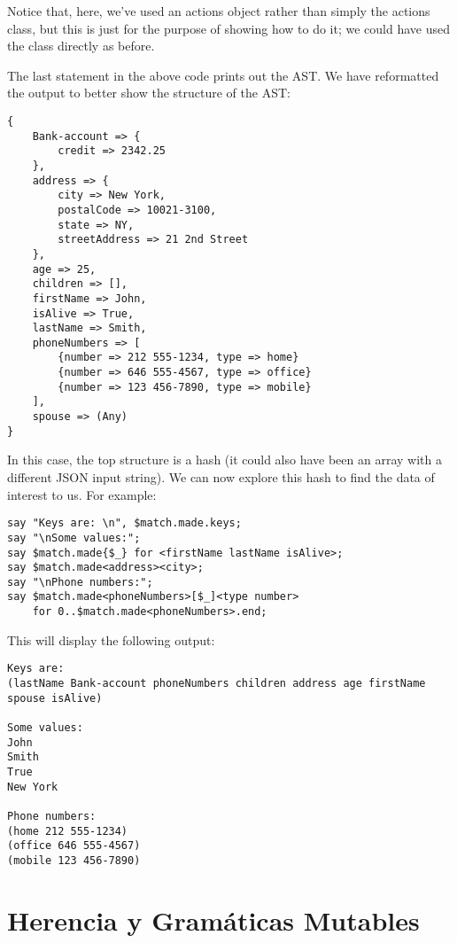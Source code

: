 Notice that, here, we've used an actions object rather than 
simply the actions class, but this is just for the purpose of 
showing how to do it; we could have used the class directly 
as before.

The last statement in the above code prints out the AST. 
We have reformatted the output to better show the 
structure of the AST:

\begin{verbatim}
{
    Bank-account => {
        credit => 2342.25
    }, 
    address => {
        city => New York, 
        postalCode => 10021-3100, 
        state => NY, 
        streetAddress => 21 2nd Street
    }, 
    age => 25, 
    children => [], 
    firstName => John, 
    isAlive => True, 
    lastName => Smith, 
    phoneNumbers => [
        {number => 212 555-1234, type => home} 
        {number => 646 555-4567, type => office} 
        {number => 123 456-7890, type => mobile}
    ], 
    spouse => (Any)
}
\end{verbatim}

In this case, the top structure is a hash (it could also have been 
an array with a different JSON input string). We can now explore 
this hash to find the data of interest to us. For example:

\begin{verbatim}
say "Keys are: \n", $match.made.keys;
say "\nSome values:";
say $match.made{$_} for <firstName lastName isAlive>;
say $match.made<address><city>;
say "\nPhone numbers:";
say $match.made<phoneNumbers>[$_]<type number> 
    for 0..$match.made<phoneNumbers>.end;
\end{verbatim}

This will display the following output:

\begin{verbatim}
Keys are:
(lastName Bank-account phoneNumbers children address age firstName spouse isAlive)

Some values:
John
Smith
True
New York

Phone numbers:
(home 212 555-1234)
(office 646 555-4567)
(mobile 123 456-7890)
\end{verbatim}

\section{Herencia y Gramáticas Mutables}

